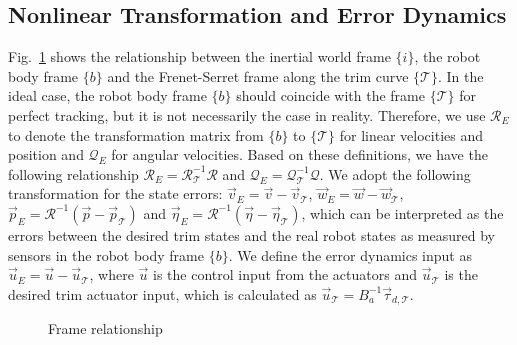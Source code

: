 \subsection{Nonlinear Transformation and Error Dynamics}
Fig.~\ref{FIG:FrameRelationship} shows the relationship between the inertial world frame $\lbrace i \rbrace$, the robot body frame $\lbrace b \rbrace$ and the Frenet-Serret frame along the trim curve $\lbrace \mathcal{T} \rbrace$. In the ideal case, the robot body frame $\lbrace b \rbrace$ should coincide with the frame $\lbrace \mathcal{T} \rbrace$ for perfect tracking, but it is not necessarily the case in reality. Therefore, we use $\mathcal{R}_{E}$ to denote  the transformation matrix from $\lbrace b \rbrace$ to $\lbrace \mathcal{T} \rbrace$ for linear velocities and position and $\mathcal{Q}_{E}$ for angular velocities. Based on these definitions, we have the following relationship $\mathcal{R}_{E}=\mathcal{R}_{\mathcal{T}}^{-1}\mathcal{R}$ and $\mathcal{Q}_{E}=\mathcal{Q}_{\mathcal{T}}^{-1}\mathcal{Q}$. We adopt the following transformation for the state errors: $\vec{v}_{E}=\vec{v}-\vec{v}_{\mathcal{T}}$, $\vec{w}_{E}=\vec{w}-\vec{w}_{\mathcal{T}}$, $\vec{p}_{E}=\mathcal{R}^{-1}(\vec{p}-\vec{p}_{\mathcal{T}})$ and $\vec{\eta}_{E}=\mathcal{R}^{-1}(\vec{\eta}-\vec{\eta}_{\mathcal{T}})$, which can be interpreted as the errors 
between the desired trim states and the real robot states as measured by sensors in the robot body frame $\lbrace b \rbrace$. We define the error dynamics input as $\vec{u}_{E}=\vec{u}-\vec{u}_{\mathcal{T}}$, where $\vec{u}$ is the control input from the actuators and $\vec{u}_{\mathcal{T}}$ is the desired trim actuator input, which is calculated as $\vec{u}_{\mathcal{T}}=B_{a}^{-1}\vec{\tau}_{d,\mathcal{T}}$.
\begin{figure}[thpb]
\center
{}
\caption{Frame relationship}	
\label{FIG:FrameRelationship}
\end{figure}

